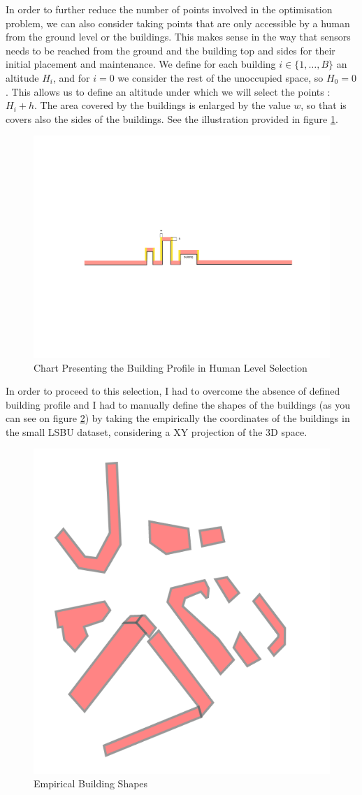 In order to further reduce the number of points involved in the optimisation problem, we can also consider taking points that are only accessible by a human from the ground level or the buildings. This makes sense in the way that sensors needs to be reached from the ground and the  building top and sides for their initial placement and maintenance. We define for each building $i \in \{1, \dots, B\}$ an altitude $H_i$, and for $i = 0$ we consider the rest of the unoccupied space, so $H_0 = 0$. This allows us to define an altitude under which we will select the points : $H_i + h$. The area covered by the buildings is enlarged by the value $w$, so that is covers also the sides of the buildings. See the illustration provided in figure \ref{fig:humanchart}. \\

\begin{figure}[t]
\centering
	\includegraphics[width = 0.7 \textwidth]{figures/DataAnalysis/HumanSelection_chart}
	\caption{Chart Presenting the Building Profile in Human Level Selection}
	\label{fig:humanchart}
\end{figure}

In order to proceed to this selection, I had to overcome the absence of defined building profile and I had to manually define the shapes of the buildings (as you can see on figure \ref{fig:buildingshapes}) by taking the empirically the coordinates of the buildings in the small LSBU dataset, considering a XY projection of the 3D space. \\

\begin{figure}[]
\centering
	\includegraphics[width = 0.3 \textwidth]{figures/DataAnalysis/buildingShapes_13}
	\caption{Empirical Building Shapes}
	\label{fig:buildingshapes}
\end{figure}

